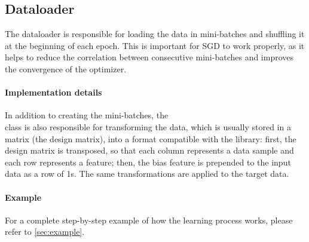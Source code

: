 \subsection{Dataloader} \label{sec:dataloader}
The dataloader is responsible for loading the data in mini-batches and shuffling it at the beginning of each epoch. This is important for \ac{SGD} to work properly, as it helps to reduce the correlation between consecutive mini-batches and improves the convergence of the optimizer.

\paragraph{Implementation details} In addition to creating the mini-batches, the\\ class is also responsible for transforming the data, which is usually stored in a  matrix (the design matrix), into a format compatible with the \mfnet library: first, the design matrix is transposed, so that each column represents a data sample and each row represents a feature; then, the bias feature is prepended to the input data as a row of 1s. The same transformations are applied to the target data.

\paragraph{Example}
For a complete step-by-step example of how the learning process works, please refer to \cref{sec:example}.

